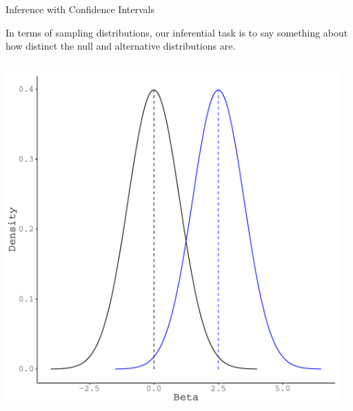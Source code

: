 \documentclass[10pt]{beamer}\usepackage[]{graphicx}\usepackage[]{color}
\makeatletter
\def\maxwidth{ %
  \ifdim\Gin@nat@width>\linewidth
    \linewidth
  \else
    \Gin@nat@width
  \fi
}
\newenvironment{knitrout}{}{} %
\makeatother
\begin{document}

\begin{frame}{Inference with Confidence Intervals}
  
  In terms of sampling distributions, our inferential task is to say something 
  about how distinct the null and alternative distributions are.
 


\begin{columns}
  \begin{column}{0.5\textwidth}
   
\begin{knitrout}\footnotesize
{}\color{fgcolor}

{\centering \includegraphics[width=\maxwidth]{figure/unnamed-chunk-20-1} 

}


\end{knitrout}

\end{column}
\begin{column}{0.5\textwidth}
  
\begin{knitrout}\footnotesize
{}\color{fgcolor}


\end{knitrout}
\end{column}
\end{columns}
\end{frame}
\end{document}
